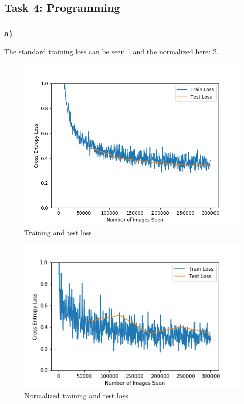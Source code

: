 \newpage
\subsection{Task 4: Programming}
\subsubsection*{a)}
The standard training loss can be seen \cref{fig:training_loss} and the normalized here: \cref{fig:normalized_training_loss}. 

\begin{figure}[]
    \centering
    \includegraphics[width=1.00\textwidth]{figures/training_loss.png}
    \caption{Training and test loss}
    \label{fig:training_loss}
\end{figure}

\begin{figure}[]
    \centering
    \includegraphics[width=1.00\textwidth]{figures/normalized_training_loss.png}
    \caption{Normalized training and test loss}
    \label{fig:normalized_training_loss}
\end{figure}

